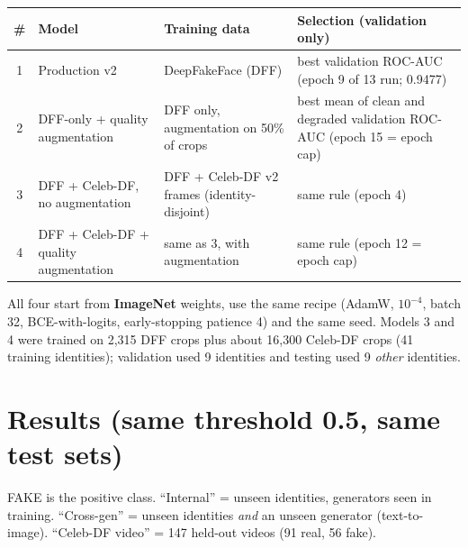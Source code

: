 \documentclass[11pt,a4paper]{report}
\begin{document}
\begin{center}
\small
\begin{tabular}{|c|p{3.6cm}|p{3.4cm}|p{4.8cm}|}
\hline
\textbf{\#} & \textbf{Model} & \textbf{Training data} & \textbf{Selection (validation only)}\\\hline
1 & Production v2 & DeepFakeFace (DFF) & best validation ROC-AUC (epoch 9 of 13 run; 0.9477)\\\hline
2 & DFF-only + quality augmentation & DFF only, augmentation on 50\% of crops & best mean of clean and degraded validation ROC-AUC (epoch 15 = epoch cap)\\\hline
3 & DFF + Celeb-DF, no augmentation & DFF + Celeb-DF v2 frames (identity-disjoint) & same rule (epoch 4)\\\hline
4 & DFF + Celeb-DF + quality augmentation & same as 3, with augmentation & same rule (epoch 12 = epoch cap)\\\hline
\end{tabular}
\end{center}
All four start from \textbf{ImageNet} weights, use the same recipe (AdamW, $10^{-4}$, batch 32, BCE-with-logits, early-stopping patience 4) and the same seed.
Models 3 and 4 were trained on 2,315 DFF crops plus about 16,300 Celeb-DF crops (41 training identities); validation used 9 identities and testing used 9 \emph{other} identities.

\section{Results (same threshold 0.5, same test sets)}
FAKE is the positive class. ``Internal'' = unseen identities, generators seen in training. ``Cross-gen'' = unseen identities \emph{and} an unseen generator (text-to-image). ``Celeb-DF video'' = 147 held-out videos (91 real, 56 fake).
\end{document}
